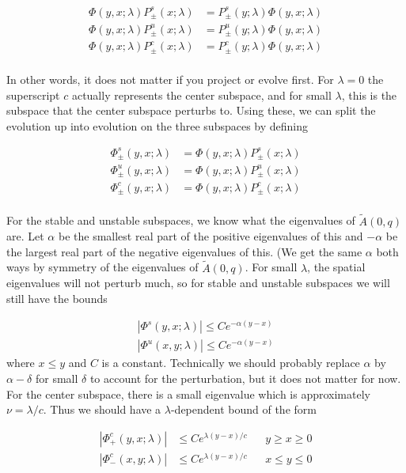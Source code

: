 \documentclass[12pt]{article}
\begin{document}
\begin{align*}
\Phi(y, x; \lambda)P^s_\pm(x; \lambda) &= P^s_\pm(y; \lambda)\Phi(y, x; \lambda) \\
\Phi(y, x; \lambda)P^u_\pm(x; \lambda) &= P^u_\pm(y; \lambda)\Phi(y, x; \lambda) \\
\Phi(y, x; \lambda)P^c_\pm(x; \lambda) &= P^c_\pm(y; \lambda)\Phi(y, x; \lambda) \\
\end{align*}

In other words, it does not matter if you project or evolve first. For $\lambda = 0$ the superscript $c$ actually represents the center subspace, and for small $\lambda$, this is the subspace that the center subspace perturbs to. Using these, we can split the evolution up into evolution on the three subspaces by defining

\begin{align*}
\Phi^s_\pm(y, x; \lambda) &= \Phi(y, x; \lambda)P^s_\pm(x; \lambda) \\
\Phi^u_\pm(y, x; \lambda) &= \Phi(y, x; \lambda)P^u_\pm(x; \lambda) \\
\Phi^c_\pm(y, x; \lambda) &= \Phi(y, x; \lambda)P^c_\pm(x; \lambda) \\
\end{align*}

For the stable and unstable subspaces, we know what the eigenvalues of $\tilde{A}(0, q)$ are. Let $\alpha$ be the smallest real part of the positive eigenvalues of this and $-\alpha$ be the largest real part of the negative eigenvalues of this. (We get the same $\alpha$ both ways by symmetry of the eigenvalues of $\tilde{A}(0, q)$. For small $\lambda$, the spatial eigenvalues will not perturb much, so for stable and unstable subspaces we will still have the bounds

\begin{align*}
|\Phi^s(y, x; \lambda)| \leq C e^{-\alpha(y-x)} \\
|\Phi^u(x, y; \lambda)| \leq C e^{-\alpha(y-x)}
\end{align*}
where $x \leq y$ and $C$ is a constant. Technically we should probably replace $\alpha$ by $\alpha - \delta$ for small $\delta$ to account for the perturbation, but it does not matter for now.\\

For the center subspace, there is a small eigenvalue which is approximately $\nu = \lambda / c$. Thus we should have a $\lambda$-dependent bound of the form

\begin{align*}
|\Phi^c_+(y, x; \lambda)| &\leq C e^{\lambda(y-x)/c} && y \geq x \geq 0 \\
|\Phi^c_-(x, y; \lambda)| &\leq C e^{\lambda(y-x)/c} && x \leq y \leq 0 \\
\end{align*}
\end{document}
